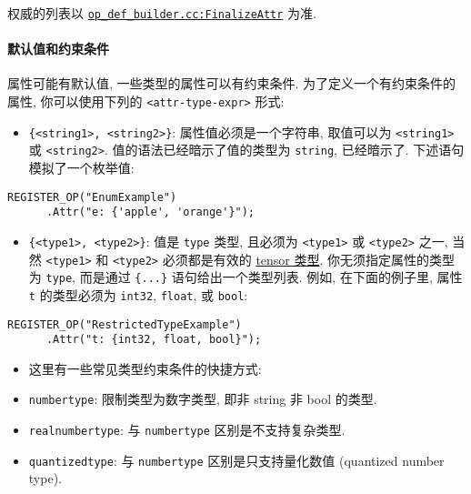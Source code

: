 权威的列表以
\href{https://tensorflow.googlesource.com/tensorflow/+/master/tensorflow/core/framework/op_def_builder.cc\#FinalizeAttr}{\texttt{op\_def\_builder.cc:FinalizeAttr}}
为准.

\paragraph{默认值和约束条件
}\label{ux9ed8ux8ba4ux503cux548cux7ea6ux675fux6761ux4ef6}

属性可能有默认值, 一些类型的属性可以有约束条件.
为了定义一个有约束条件的属性, 你可以使用下列的
\texttt{\textless{}attr-type-expr\textgreater{}} 形式:

\begin{itemize}
\tightlist
\item
  \texttt{\{\textquotesingle{}\textless{}string1\textgreater{}\textquotesingle{},\ \textquotesingle{}\textless{}string2\textgreater{}\textquotesingle{}\}}:
  属性值必须是一个字符串, 取值可以为
  \texttt{\textless{}string1\textgreater{}} 或
  \texttt{\textless{}string2\textgreater{}}.
  值的语法已经暗示了值的类型为 \texttt{string}, 已经暗示了.
  下述语句模拟了一个枚举值:
\end{itemize}

\begin{verbatim}
REGISTER_OP("EnumExample")
      .Attr("e: {'apple', 'orange'}");
\end{verbatim}

\begin{itemize}
\tightlist
\item
  \texttt{\{\textless{}type1\textgreater{},\ \textless{}type2\textgreater{}\}}:
  值是 \texttt{type} 类型, 且必须为
  \texttt{\textless{}type1\textgreater{}} 或
  \texttt{\textless{}type2\textgreater{}} 之一, 当然
  \texttt{\textless{}type1\textgreater{}} 和
  \texttt{\textless{}type2\textgreater{}} 必须都是有效的
  \href{tensorflow-zh/SOURCE/resources/dims_types.md\#data-types}{tensor
  类型}. 你无须指定属性的类型为 \texttt{type}, 而是通过 \texttt{\{...\}}
  语句给出一个类型列表. 例如, 在下面的例子里, 属性 \texttt{t}
  的类型必须为 \texttt{int32}, \texttt{float}, 或 \texttt{bool}:
\end{itemize}

\begin{verbatim}
REGISTER_OP("RestrictedTypeExample")
      .Attr("t: {int32, float, bool}");
\end{verbatim}

\begin{itemize}
\item
  这里有一些常见类型约束条件的快捷方式:
\item
  \texttt{numbertype}: 限制类型为数字类型, 即非 string 非 bool 的类型.
\item
  \texttt{realnumbertype}: 与 \texttt{numbertype} 区别是不支持复杂类型.
\item
  \texttt{quantizedtype}: 与 \texttt{numbertype} 区别是只支持量化数值
  (quantized number type).
\end{itemize}

